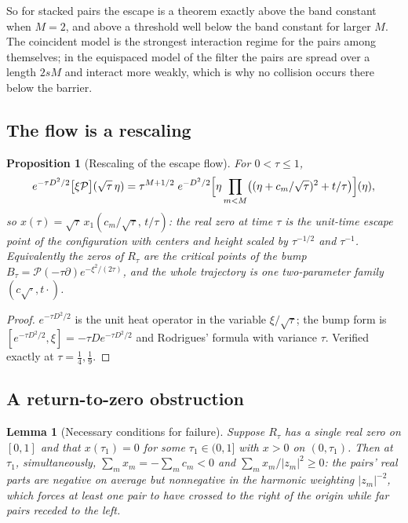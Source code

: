 \documentclass[11pt]{article}
\newtheorem{proposition}[theorem]{Proposition}
\newtheorem{lemma}[theorem]{Lemma}
\theoremstyle{definition}
\theoremstyle{remark}
\begin{document}
So for stacked pairs the escape is a theorem exactly above the band
constant when \(M=2\), and above a threshold well below the band constant
for larger \(M\).  The coincident model is the strongest interaction
regime for the pairs among themselves; in the equispaced model of the
filter the pairs are spread over a length \(2sM\) and interact more
weakly, which is why no collision occurs there below the barrier.

\subsection{The flow is a rescaling}

\begin{proposition}[Rescaling of the escape flow]
\label{prop:f2v78-rescale}
For \(0<\tau\le1\),
\begin{equation}
 e^{-\tau D^2/2}\bigl[\xi\mathcal P\bigr](\sqrt\tau\,\eta)
 =\tau^{M+1/2}\;e^{-D^2/2}\Bigl[\eta\prod_{m<M}\bigl((\eta+c_m/\sqrt\tau)^2+t/\tau\bigr)\Bigr](\eta),
 \label{eq:f2v78-rescale}
\end{equation}
so \(x(\tau)=\sqrt\tau\,x_1(c_m/\sqrt\tau,\,t/\tau)\): the real zero at
time \(\tau\) is the unit-time escape point of the configuration with
centers and height scaled by \(\tau^{-1/2}\) and \(\tau^{-1}\).
Equivalently the zeros of \(R_\tau\) are the critical points of the bump
\(B_\tau=\mathcal P(-\tau\partial)e^{-\xi^2/(2\tau)}\), and the whole
trajectory is one two-parameter family \((c\sqrt{\cdot},t\cdot)\).
\end{proposition}

\begin{proof}
\(e^{-\tau D^2/2}\) is the unit heat operator in the variable
\(\xi/\sqrt\tau\); the bump form is \([e^{-\tau D^2/2},\xi]=-\tau De^{-\tau D^2/2}\)
and Rodrigues' formula with variance \(\tau\).  Verified exactly at
\(\tau=\tfrac14,\tfrac19\).
\end{proof}

\subsection{A return-to-zero obstruction}

\begin{lemma}[Necessary conditions for failure]
\label{lem:f2v78-return}
Suppose \(R_\tau\) has a single real zero on \([0,1]\) and that
\(x(\tau_1)=0\) for some \(\tau_1\in(0,1]\) with \(x>0\) on
\((0,\tau_1)\).  Then at \(\tau_1\), simultaneously,
\(\sum_mx_m=-\sum_mc_m<0\) and \(\sum_mx_m/|z_m|^2\ge0\): the pairs'
real parts are negative on average but nonnegative in the harmonic
weighting \(|z_m|^{-2}\), which forces at least one pair to have
crossed to the right of the origin while far pairs receded to the
left.
\end{lemma}
\end{document}
